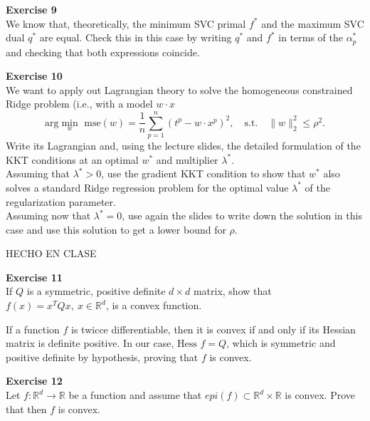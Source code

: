 \documentclass[11pt,table]{article}
\newenvironment{problem}[2][Exercise]
{ \begin{mdframed}[backgroundcolor=gray!20] \textbf{#1 #2} \\}
	{  \end{mdframed}}
\newcommand\norm[1]{\lVert#1\rVert}
\begin{document}
	\begin{problem}{9}
		We know that, theoretically, the minimum SVC primal \(f^*\) and the maximum SVC dual \(q^*\) are equal. Check this in this case by writing \(q^*\) and \(f^*\) in terms of the \(\alpha_p^*\) and checking that both expressions coincide.
	\end{problem}
	
	\begin{problem}{10}
		We want to apply out Lagrangian theory to solve the homogeneous constrained Ridge problem (i.e., with a model \(w\cdot x\)
		\[
		\text{arg}\min_{w} \text{ mse}(w) = \frac{1}{n} \sum_{p=1}^n (t^p - w \cdot x^p)^2, \quad \text{s.t.} \quad \norm{w}_2^2 \leq \rho^2.
		\]
		Write its Lagrangian and, using the lecture slides, the detailed formulation of the KKT conditions at an optimal \(w^*\) and multiplier \(\lambda^*\).\\
		Assuming that \(\lambda^* > 0\), use the gradient KKT condition to show that \(w^*\) also solves a standard Ridge regression problem for the optimal value \(\lambda^*\) of the regularization parameter.\\
		Assuming now that \(\lambda^* = 0\), use again the slides to write down the solution in this case and use this solution to get a lower bound for \(\rho\).
	\end{problem}
	
	HECHO EN CLASE
	
	\begin{problem}{11}
		If \( Q \) is a symmetric, positive definite \( d \times d \) matrix, show that \( f(x) = x^TQx, \ x \in \mathbb{R}^d \), is a convex function.
	\end{problem}
	
	If a function $f$ is twicce differentiable, then it is convex if and only if its Hessian matrix is definite positive. In our case, $\text{Hess }f = Q$, which is symmetric and positive definite by hypothesis, proving that $f$ is convex. \\
	
	\begin{problem}{12}
		Let \( f:\mathbb{R}^d \to \mathbb{R} \)  be a function and assume that \( epi(f) \subset \mathbb{R}^d \times \mathbb{R} \)  is convex. Prove that then \( f \)  is convex.
		
	\end{problem}
	
\end{document}
